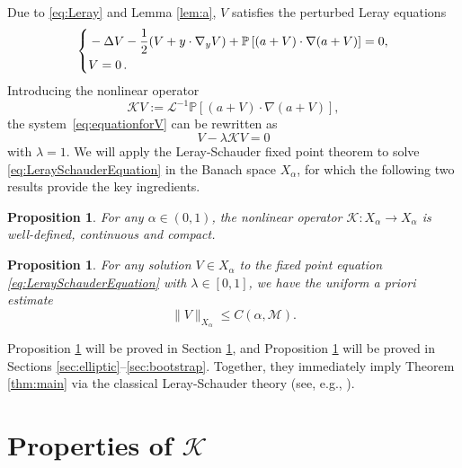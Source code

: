 \documentclass[12pt,reqno]{amsart}
\theoremstyle{plain}
\newtheorem{proposition}[theorem]{Proposition}
\theoremstyle{definition}
\newcommand{\M}{\mathcal{M}}
\renewcommand{\:}{\colon}
\let\div\relax
\DeclareMathOperator{\div}{div}
\numberwithin{equation}{section}
\numberwithin{figure}{section}
\begin{document}
Due to \eqref{eq:Leray} and Lemma \ref{lem:a}, $V$ satisfies the perturbed Leray equations
\begin{equation}
	\label{eq:equationforV}
	\left\{
\begin{aligned}
	&- \Delta V - \frac{1}{2} (V + y \cdot \nabla_y V) + \mathbb{P} \left[(a+V) \cdot \nabla (a+V) \right]= 0, \\
	&\div V = 0 \, .
\end{aligned}\right.
\end{equation}
Introducing the nonlinear operator
\begin{equation}
	\label{eq:Kdef}
	\mathcal{K}V := \mathcal{L}^{-1}  \mathbb{P} [(a+V) \cdot \nabla (a+V) ],
\end{equation}
the system~\eqref{eq:equationforV} can be rewritten as 
\begin{equation}
	\label{eq:LeraySchauderEquation}
	V - \lambda \mathcal{K} V = 0
\end{equation}
with $\lambda = 1$. We will apply the Leray-Schauder fixed point theorem  to solve \eqref{eq:LeraySchauderEquation} in the Banach space $X_\alpha$, for which the following two results provide the key ingredients.


\begin{proposition}
	\label{prop:K}
	For any $\alpha \in (0,1)$, the nonlinear operator $\mathcal{K} : X_\alpha \to X_\alpha$ is well-defined, continuous and compact.
\end{proposition}

\begin{proposition}
\label{prop:fullaprioriestimate}
For any solution $V \in X_\alpha$ to the fixed point equation \eqref{eq:LeraySchauderEquation} with $\lambda \in [0,1]$, we have the uniform {a priori} estimate
	\begin{equation} \label{eq:fullaprioriestimate}
		\| V \|_{X_\alpha} \le C(\alpha, \M).
	\end{equation}
\end{proposition}

Proposition \ref{prop:K} will be proved in Section \ref{sec:K}, and Proposition \ref{prop:fullaprioriestimate} will be proved in Sections \ref{sec:elliptic}--\ref{sec:bootstrap}. Together, they immediately  imply Theorem \ref{thm:main}   via the classical Leray-Schauder theory (see, e.g.,  \cite[Theorem 1.2.17]{KorobBook}).



\section{Properties of \texorpdfstring{$\mathcal{K}$}{K}} \label{sec:K}
\end{document}
